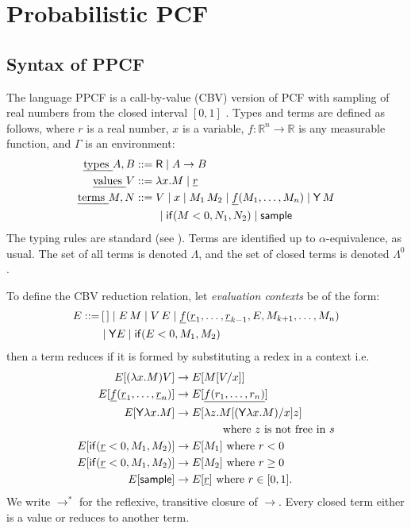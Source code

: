 \section{Probabilistic PCF}
\label{sec:PPCF}

\subsection{Syntax of PPCF}

The language PPCF is a call-by-value (CBV) version of PCF with sampling of real numbers from the closed interval $[0,1]$ \cite{Ehrhard2018c,DBLP:journals/pacmpl/EhrhardPT18,MakOPW21}.
Types and terms are defined as follows, where $r$ is a real number, $x$ is a variable, $f : \mathbb{R}^n \to \mathbb{R}$ is any measurable function, and $\Gamma$ is an environment:
\begin{align*}
  \text{\em types } A, B &::= \textsf{R}  \mid  A \to B \\
  \text{\em values } V &::= \lambda x.M  \mid  \underline{r} \\
  \text{\em terms } M, N &::= V  \mid  x  \mid  M_1 \, M_2  \mid  \underline{f}(M_1,\dots ,M_n)  \mid  \mathsf{Y} \, M \\
   & \qquad \mid  \mathsf{if}(M < 0, N_1, N_2)  \mid  \mathsf{sample}
\end{align*}
The typing rules are standard (see ).
Terms are identified up to $\alpha$-equivalence, as usual. 
The set of all terms is denoted $\Lambda$, and the set of closed terms is denoted $\Lambda^0$.

To define the CBV reduction relation, let \emph{evaluation contexts} be of the form:
\begin{align*}
  E ::= & \, [\,] \mid E \, M \mid V \, E \mid \underline{f}(\underline r_1,\dots ,\underline r_{k-1}, E, M_{k+1}, \dots, M_n) \\ & \mid \mathsf{Y} E \mid \mathsf{if}(E<0, M_1, M_2)
\end{align*}
then a term reduces if it is formed by substituting a redex in a context i.e.
\begin{align*}
  E[(\lambda x.M) V] & \to E[M[V/x]] \\
  E[\underline f (\underline r_1, \dots , \underline r_n)] & \to E[\underline{f(r_1,\dots,r_n)}] \\
  E[\mathsf{Y} \lambda x. M] & \to E[\lambda z. M[(\mathsf{Y} \lambda x. M)/x] z] \\
  & \qquad \qquad \text{ where $z$ is not free in $s$}\\
  E[\mathsf{if}(\underline r < 0, M_1, M_2)] & \to E[M_1] \text{ where }r < 0 \\
  E[\mathsf{if}(\underline r < 0, M_1, M_2)] & \to E[M_2] \text{ where }r \geq 0 \\
  E[\mathsf{sample}] & \to E[\underline r] \text{ where } r \in [0,1].
\end{align*}
We write $\to^\ast$ for the reflexive, transitive closure of $\to$.
Every closed term either is a value or reduces to another term.


